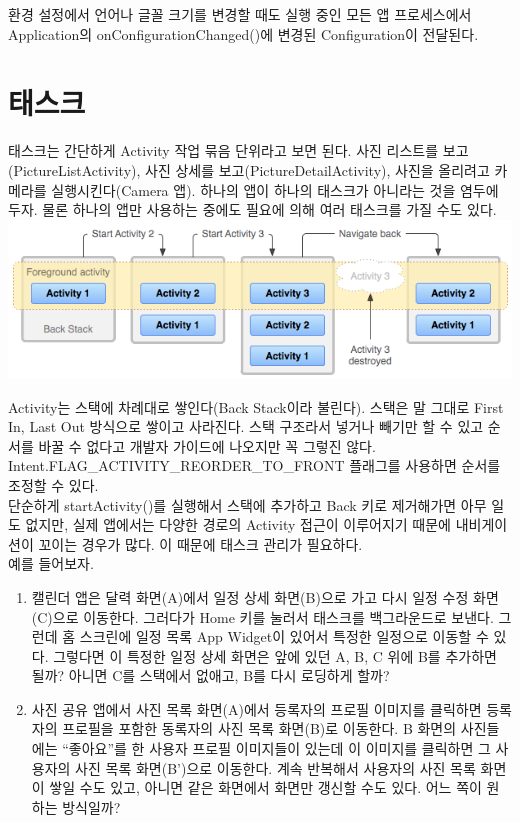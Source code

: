 환경 설정에서 언어나 글꼴 크기를 변경할 때도 실행 중인 모든 앱 프로세스에서 Application의 onConfigurationChanged()에 변경된 Configuration이 전달된다.

\section{태스크}
태스크는 간단하게 Activity 작업 묶음 단위라고 보면 된다. 사진 리스트를 보고(PictureListActivity), 사진 상세를 보고(PictureDetailActivity), 사진을 올리려고 카메라를 실행시킨다(Camera 앱).
하나의 앱이 하나의 태스크가 아니라는 것을 염두에 두자. 물론 하나의 앱만 사용하는 중에도 필요에 의해 여러 태스크를 가질 수도 있다.\\
\includegraphics[scale=0.6]{diagram_backstack}

Activity는 스택에 차례대로 쌓인다(Back Stack이라 불린다). 스택은 말 그대로 First In, Last Out 방식으로 쌓이고 사라진다. 
스택 구조라서 넣거나 빼기만 할 수 있고 순서를 바꿀 수 없다고 개발자 가이드에 나오지만 꼭 그렇진 않다. 
Intent.FLAG\_ACTIVITY\_REORDER\_TO\_FRONT 플래그를 사용하면 순서를 조정할 수 있다.\\

단순하게 startActivity()를 실행해서 스택에 추가하고 Back 키로 제거해가면 아무 일도 없지만, 실제 앱에서는 다양한 경로의 Activity 접근이 이루어지기 때문에 내비게이션이 꼬이는 경우가 많다. 
이 때문에 태스크 관리가 필요하다.\\

예를 들어보자. 
\begin{enumerate}
\item 캘린더 앱은 달력 화면(A)에서 일정 상세 화면(B)으로 가고 다시 일정 수정 화면(C)으로 이동한다. 그러다가 Home 키를 눌러서 태스크를 백그라운드로 보낸다. 
그런데 홈 스크린에 일정 목록 App Widget이 있어서 특정한 일정으로 이동할 수 있다. 그렇다면 이 특정한 일정 상세 화면은 앞에 있던 A, B, C 위에 B를 추가하면 될까? 
아니면 C를 스택에서 없애고, B를 다시 로딩하게 할까?

\item 사진 공유 앱에서 사진 목록 화면(A)에서 등록자의 프로필 이미지를 클릭하면 등록자의 프로필을 포함한 동록자의 사진 목록 화면(B)로 이동한다. 
B 화면의 사진들에는 ``좋아요''를 한 사용자 프로필 이미지들이 있는데 이 이미지를 클릭하면 그 사용자의 사진 목록 화면(B')으로 이동한다. 계속 반복해서 사용자의 사진 목록 화면이 쌓일 수도 있고, 아니면 같은 화면에서 화면만 갱신할 수도 있다. 어느 쪽이 원하는 방식일까?
\end{enumerate}


